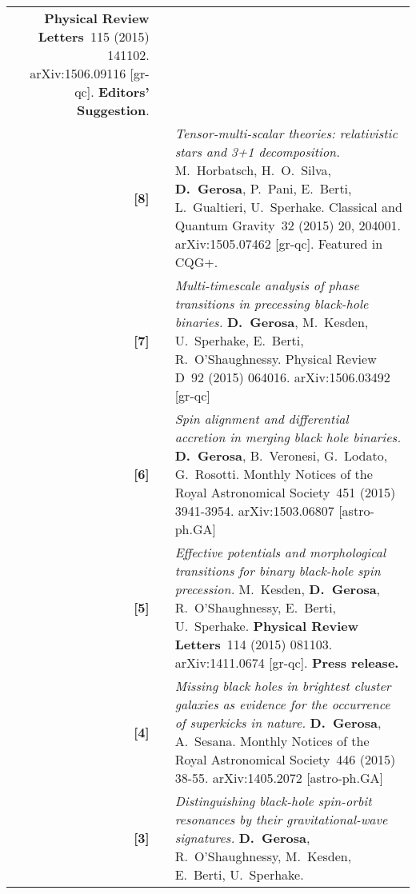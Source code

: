 \documentclass[11pt,a4paper,sans]{moderncv}   %
\newcommand{\mnras}{Monthly Notices of the Royal Astronomical Society}
\newcommand{\prd}{Physical Review D}
\newcommand{\prl}{Physical Review Letters}
\newcommand{\cqg}{Classical and Quantum Gravity}
\begin{document}
{\begin{longtable}{rp{0.3cm}p{15.8cm}}
\textbf{\prl}~115 (2015) 141102.
arXiv:1506.09116 [gr-qc].  \textbf{Editors' Suggestion}.
\vspace{0.05cm}\\
\textbf{[8]} & & \textit{Tensor-multi-scalar theories: relativistic stars and 3+1 decomposition.} 
\newline{}
M.~Horbatsch, H.~O.~Silva, \textbf{D.~Gerosa}, P.~Pani,  E.~Berti, L.~Gualtieri, U.~Sperhake.
  \newline{}
\cqg~32 (2015) 20, 204001.
arXiv:1505.07462 [gr-qc]. Featured in CQG+.
\vspace{0.05cm}\\
\textbf{[7]} & & \textit{Multi-timescale analysis of phase transitions in precessing black-hole binaries.} 
\newline{}
\textbf{D.~Gerosa}, M.~Kesden, U.~Sperhake, E.~Berti, R.~O’Shaughnessy.
  \newline{}
\prd~92 (2015) 064016. arXiv:1506.03492 [gr-qc]
\vspace{0.05cm}\\
\textbf{[6]} & & \textit{Spin alignment and differential accretion in merging black hole binaries.}
\newline{}
\textbf{D.~Gerosa}, B.~Veronesi, G.~Lodato, G.~Rosotti. 
\newline{}
\mnras~451 (2015) 3941-3954. arXiv:1503.06807 [astro-ph.GA]
\vspace{0.05cm}\\
\textbf{[5]} & & \textit{Effective potentials and morphological transitions for binary black-hole spin precession.}
\newline{}
M.~Kesden, \textbf{D.~Gerosa}, R.~O'Shaughnessy, E.~Berti, U.~Sperhake.
\newline{}
\textbf{\prl}~114 (2015) 081103. arXiv:1411.0674 [gr-qc]. \textbf{Press release.}
\vspace{0.05cm}\\
\textbf{[4]} & & \textit{Missing black holes in brightest cluster galaxies as evidence for the occurrence of superkicks in nature.}
\newline{}
\textbf{D.~Gerosa}, A.~Sesana.
\newline{}
\mnras~446 (2015) 38-55. arXiv:1405.2072 [astro-ph.GA]
\vspace{0.05cm}\\
\textbf{[3]} & & \textit{Distinguishing black-hole spin-orbit resonances by their gravitational-wave signatures.}
\newline{}
\textbf{D.~Gerosa}, R.~O'Shaughnessy, M.~Kesden, E.~Berti, U.~Sperhake. 

\end{longtable}}
\end{document}
